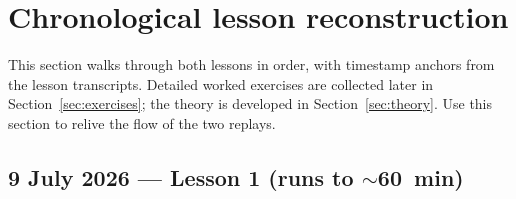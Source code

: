 \documentclass[11pt,a4paper]{article}
\begin{document}
\clearpage
\section{Chronological lesson reconstruction}

This section walks through both lessons in order, with timestamp anchors from the lesson
transcripts. Detailed worked exercises are collected later in
Section~\ref{sec:exercises}; the theory is developed in Section~\ref{sec:theory}. Use this
section to relive the flow of the two replays.

\subsection{9 July 2026 --- Lesson 1 (runs to \texorpdfstring{$\sim$}{}\SI{60}{min})}
\end{document}
